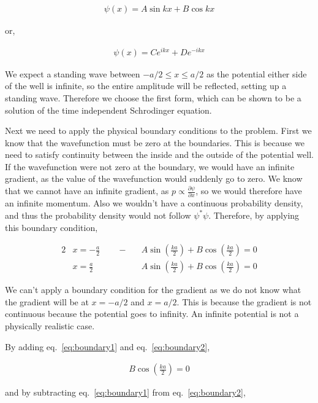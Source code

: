 \documentclass[11pt]{amsart}
\begin{document}
\begin{align*}
  \psi(x) = A\sin{kx} + B\cos{kx}
\end{align*}

or,

\begin{align*}
  \psi(x) = Ce^{ikx} + De^{-ikx}
\end{align*}

We expect a standing wave between $-a/2 \leq x \leq a/2$ as the potential either side of the well is infinite, so the entire amplitude will be reflected, setting up a standing wave. Therefore we choose the first form, which can be shown to be a solution of the time independent Schrodinger equation.

Next we need to apply the physical boundary conditions to the problem. First we know that the wavefunction must be zero at the boundaries. This is because we need to satisfy continuity between the inside and the outside of the potential well. If the wavefunction were not zero at the boundary, we would have an infinite gradient, as the value of the wavefunction would suddenly go to zero. We know that we cannot have an infinite gradient, as $p \propto \frac{\partial\psi}{\partial x}$, so we would therefore have an infinite momentum. Also we wouldn't have a continuous probability density, and thus the probability density would not follow $\psi^* \psi$. Therefore, by applying this boundary condition,

\begin{alignat}{2}
  \label{eq:boundary1}
  &x = -\frac{a}{2} \qquad -&&A\sin{\left(\frac{ka}{2}\right)} + B\cos{\left(\frac{ka}{2}\right)} = 0 \\
  \label{eq:boundary2}
  &x =  \frac{a}{2} \qquad  &&A\sin{\left(\frac{ka}{2}\right)} + B\cos{\left(\frac{ka}{2}\right)} = 0
\end{alignat}

We can't apply a boundary condition for the gradient as we do not know what the gradient will be at $x = -a/2$ and $x = a/2$. This is because the gradient is not continuous because the potential goes to infinity. An infinite potential is not a physically realistic case.

By adding eq.~\ref{eq:boundary1} and eq.~\ref{eq:boundary2},

\begin{align*}
  B \cos{\left(\frac{ka}{2}\right)} = 0
\end{align*}

and by subtracting eq.~\ref{eq:boundary1} from eq.~\ref{eq:boundary2},
\end{document}
